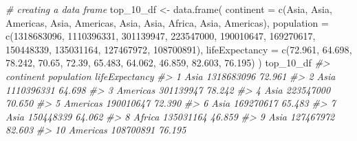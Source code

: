 \documentclass[
]{book}
\newenvironment{Shaded}{\begin{snugshade}}{\end{snugshade}}
\newcommand{\AttributeTok}[1]{\textcolor[rgb]{0.77,0.63,0.00}{#1}}
\newcommand{\CommentTok}[1]{\textcolor[rgb]{0.56,0.35,0.01}{\textit{#1}}}
\newcommand{\DecValTok}[1]{\textcolor[rgb]{0.00,0.00,0.81}{#1}}
\newcommand{\FloatTok}[1]{\textcolor[rgb]{0.00,0.00,0.81}{#1}}
\newcommand{\FunctionTok}[1]{\textcolor[rgb]{0.00,0.00,0.00}{#1}}
\newcommand{\NormalTok}[1]{#1}
\newcommand{\OtherTok}[1]{\textcolor[rgb]{0.56,0.35,0.01}{#1}}
\newcommand{\StringTok}[1]{\textcolor[rgb]{0.31,0.60,0.02}{#1}}
\begin{document}
\begin{Shaded}
\begin{Highlighting}[]
\CommentTok{\# creating a data frame}
\NormalTok{top\_10\_df }\OtherTok{\textless{}{-}} \FunctionTok{data.frame}\NormalTok{(}
\AttributeTok{continent =} \FunctionTok{c}\NormalTok{(}\StringTok{\textquotesingle{}Asia\textquotesingle{}}\NormalTok{, }\StringTok{\textquotesingle{}Asia\textquotesingle{}}\NormalTok{, }\StringTok{\textquotesingle{}Americas\textquotesingle{}}\NormalTok{, }\StringTok{\textquotesingle{}Asia\textquotesingle{}}\NormalTok{, }\StringTok{\textquotesingle{}Americas\textquotesingle{}}\NormalTok{, }
              \StringTok{\textquotesingle{}Asia\textquotesingle{}}\NormalTok{, }\StringTok{\textquotesingle{}Asia\textquotesingle{}}\NormalTok{, }\StringTok{\textquotesingle{}Africa\textquotesingle{}}\NormalTok{, }\StringTok{\textquotesingle{}Asia\textquotesingle{}}\NormalTok{, }\StringTok{\textquotesingle{}Americas\textquotesingle{}}\NormalTok{),}
\AttributeTok{population =} \FunctionTok{c}\NormalTok{(}\DecValTok{1318683096}\NormalTok{, }\DecValTok{1110396331}\NormalTok{, }\DecValTok{301139947}\NormalTok{, }\DecValTok{223547000}\NormalTok{, }\DecValTok{190010647}\NormalTok{, }
               \DecValTok{169270617}\NormalTok{, }\DecValTok{150448339}\NormalTok{, }\DecValTok{135031164}\NormalTok{, }\DecValTok{127467972}\NormalTok{, }\DecValTok{108700891}\NormalTok{),}
\AttributeTok{lifeExpectancy =} \FunctionTok{c}\NormalTok{(}\FloatTok{72.961}\NormalTok{, }\FloatTok{64.698}\NormalTok{, }\FloatTok{78.242}\NormalTok{, }\FloatTok{70.65}\NormalTok{, }\FloatTok{72.39}\NormalTok{, }
                   \FloatTok{65.483}\NormalTok{, }\FloatTok{64.062}\NormalTok{, }\FloatTok{46.859}\NormalTok{, }\FloatTok{82.603}\NormalTok{, }\FloatTok{76.195}\NormalTok{)}
\NormalTok{    )}
\NormalTok{top\_10\_df}
\CommentTok{\#\textgreater{}    continent population lifeExpectancy}
\CommentTok{\#\textgreater{} 1       Asia 1318683096         72.961}
\CommentTok{\#\textgreater{} 2       Asia 1110396331         64.698}
\CommentTok{\#\textgreater{} 3   Americas  301139947         78.242}
\CommentTok{\#\textgreater{} 4       Asia  223547000         70.650}
\CommentTok{\#\textgreater{} 5   Americas  190010647         72.390}
\CommentTok{\#\textgreater{} 6       Asia  169270617         65.483}
\CommentTok{\#\textgreater{} 7       Asia  150448339         64.062}
\CommentTok{\#\textgreater{} 8     Africa  135031164         46.859}
\CommentTok{\#\textgreater{} 9       Asia  127467972         82.603}
\CommentTok{\#\textgreater{} 10  Americas  108700891         76.195}


\end{Highlighting}
\end{Shaded}
\end{document}
